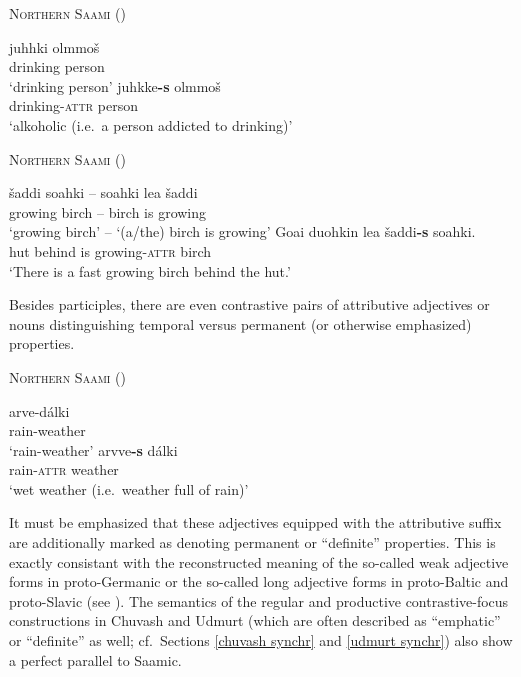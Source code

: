 {\begin{exe}
\ex
\begin{xlist}
\ex \textsc{Northern Saami} (\citealt[204]{nielsen1945b})
\begin{xlist}
\ex
\gll 	juhhki olmmoš\\
	drinking person\\
\glt	 ‘drinking person’
\ex	
\gll	juhkke\textbf{-s} olmmoš\\
	drinking-\textsc{attr} person\\
\glt	‘alkoholic (i.e.~a person addicted to drinking)’
\end{xlist}
\ex \textsc{Northern Saami} (\citealt[282]{bartens1989})
\begin{xlist}
\ex 	
\gll	šaddi soahki – soahki lea šaddi\\
 	growing birch – birch is growing\\
\glt	‘growing birch’ – ‘(a/the) birch is growing’
\ex
\gll	Goa{\dj}i duohkin lea šaddi\textbf{-s} soahki.\\
	hut behind is growing-\textsc{attr} birch\\
\glt	‘There is a fast growing birch behind the hut.’
\end{xlist}
\end{xlist}
\end{exe}
Besides participles, there are even contrastive pairs of attributive adjectives or nouns distinguishing temporal versus permanent (or otherwise emphasized) properties.

\begin{exe}
\ex
\begin{xlist}
\ex \textsc{Northern Saami} (\citealt[48]{bergsland1976})
\begin{xlist}
\ex
\gll	arve-dálki\\
	rain-weather\\
\glt	‘rain-weather’
\ex
\gll	arvve\textbf{-s} dálki\\
	rain-\textsc{attr} weather\\
\glt	‘wet weather (i.e.~weather full of rain)’
\end{xlist}
\end{xlist}
\end{exe}
It must be emphasized that these adjectives equipped with the attributive suffix are additionally marked as denoting permanent or “definite” properties. This is exactly consistant with the reconstructed meaning of the so-called weak adjective forms in proto-Germanic or the so-called long adjective forms in proto-Baltic and proto-Slavic (see ). The semantics of the regular and productive contrastive-focus constructions in Chuvash and Udmurt (which are often described as “emphatic” or “definite” as well; cf.~Sections \ref{chuvash synchr} and \ref{udmurt synchr}) also show a perfect parallel to Saamic. 

}
